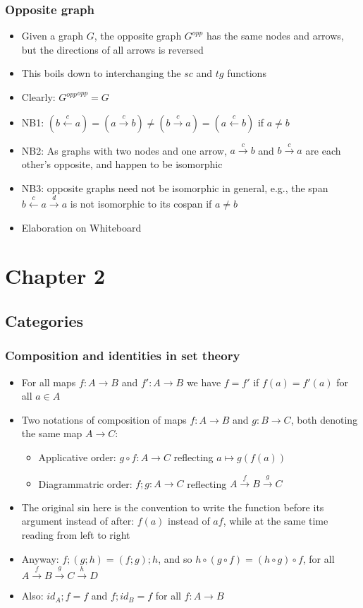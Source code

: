 \documentclass[handout]{beamer}
\begin{document}
\frame
  {   
    \frametitle{Opposite graph}\label{Ch1:oppgraph}

 \begin{itemize}[<+->]
\item Given a graph $G$, the opposite graph $G^{opp}$ has the same nodes
and arrows, but the directions of all arrows is reversed
\item This boils down to interchanging the $sc$ and $tg$ functions
\item Clearly: ${G^{opp}}^{opp} = G$
\item NB1: $(b \stackrel{c}{\leftarrow} a) = (a \stackrel{c}{\to} b) \neq  
(b \stackrel{c}{\to} a) = (a \stackrel{c}{\leftarrow} b) $
if $a\neq b$
\item NB2: As graphs with two nodes and one arrow, ${a \stackrel{c}{\to} b}$
and ${b \stackrel{c}{\to} a}$ are each other's opposite, and happen to be isomorphic
\item NB3: opposite graphs need not be isomorphic in general, e.g., the span
${b \stackrel{c}{\leftarrow} a}\stackrel{d}{\to}a$ is not isomorphic to its cospan if $a\neq b$
\item Elaboration on Whiteboard
 \end{itemize}

 }

\section{Chapter 2}
\subsection{Categories}


\frame
  {   
    \frametitle{Composition and identities in set theory}\label{Ch2:comp-id}

 \begin{itemize}[<+->]
\item For all maps $f:A\to B$ and $f':A\to B$ we have $f=f'$ if $f(a)=f'(a)$ for all $a\in A$
\item Two notations of composition of maps $f:A\to B$ and $g: B\to C$,
both denoting the same map $A\to C$:
   \begin{itemize}[<+->]
\item Applicative order: ${g\circ f} : {A\to C}$ reflecting $a\mapsto g(f(a))$
\item Diagrammatric order: ${f;g} : A\to C$ reflecting $A\stackrel{f}{\to}B\stackrel{g}{\to}C$
   \end{itemize}
\item The original sin here is the convention to write the function before its argument
instead of after: $f(a)$ instead of $af$,
while at the same time reading from left to right
\item Anyway: $f;(g;h) = (f;g);h$, and so $h\circ(g\circ f) = (h\circ g)\circ f$,
for all $A\stackrel{f}{\to}B\stackrel{g}{\to}C\stackrel{h}{\to}D$
\item Also: $id_A ; f = f$ and $f; id_B = f$ for all $f:A\to B$
 \end{itemize}

 }
\end{document}

